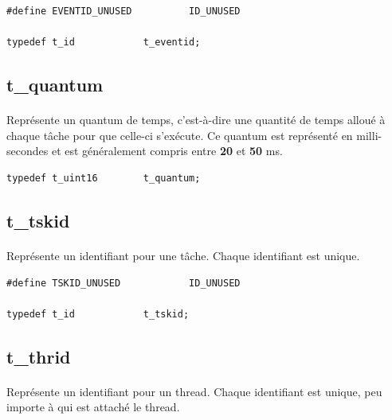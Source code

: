 \documentclass[10pt,a4wide]{article}
\begin{document}
\begin{verbatim}
#define EVENTID_UNUSED          ID_UNUSED

typedef t_id            t_eventid;
\end{verbatim}

\subsection{t\_quantum}

\paragraph{}

Repr\'esente un quantum de temps, c'est-\`a-dire une quantit\'e de temps
allou\'e \`a chaque t\^ache pour que celle-ci s'ex\'ecute. Ce quantum
est repr\'esent\'e en milli-secondes et est g\'en\'eralement compris
entre \textbf{20} et \textbf{50} ms.

\begin{verbatim}
typedef t_uint16        t_quantum;
\end{verbatim}

\subsection{t\_tskid}

\paragraph{}

Repr\'esente un identifiant pour une t\^ache. Chaque identifiant est
unique.

\begin{verbatim}
#define TSKID_UNUSED            ID_UNUSED

typedef t_id            t_tskid;
\end{verbatim}

\subsection{t\_thrid}

\paragraph{}

Repr\'esente un identifiant pour un thread. Chaque identifiant est
unique, peu importe \`a qui est attach\'e le thread.
\end{document}
